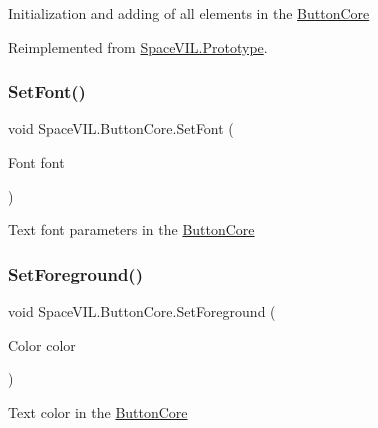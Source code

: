 Initialization and adding of all elements in the \mbox{\hyperlink{class_space_v_i_l_1_1_button_core}{Button\+Core}} 



Reimplemented from \mbox{\hyperlink{class_space_v_i_l_1_1_prototype_ac3379fe02923ee155b5b0084abf27420}{Space\+V\+I\+L.\+Prototype}}.

\mbox{\label{class_space_v_i_l_1_1_button_core_a7689c84be1b1b152a07186a32a08f273}} 
\subsubsection{\texorpdfstring{Set\+Font()}{SetFont()}}
{\footnotesize\ttfamily void Space\+V\+I\+L.\+Button\+Core.\+Set\+Font (\begin{DoxyParamCaption}\item[{Font}]{font }\end{DoxyParamCaption})\hspace{0.3cm}{\ttfamily [inline]}}



Text font parameters in the \mbox{\hyperlink{class_space_v_i_l_1_1_button_core}{Button\+Core}} 

\mbox{\label{class_space_v_i_l_1_1_button_core_aa9d1ad0d72fc521d412209dd15b5ed54}} 
\subsubsection{\texorpdfstring{Set\+Foreground()}{SetForeground()}}
{\footnotesize\ttfamily void Space\+V\+I\+L.\+Button\+Core.\+Set\+Foreground (\begin{DoxyParamCaption}\item[{Color}]{color }\end{DoxyParamCaption})\hspace{0.3cm}{\ttfamily [inline]}}



Text color in the \mbox{\hyperlink{class_space_v_i_l_1_1_button_core}{Button\+Core}} 

